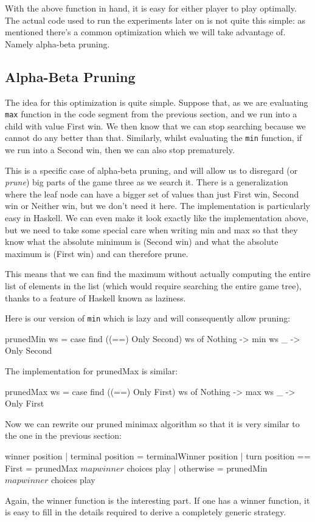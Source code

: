 With the above function in hand, it is easy for either player to play optimally.
The actual code used to run the experiments later on is not quite this simple: as mentioned there's a common optimization which we will take advantage of.
Namely alpha-beta pruning.

\subsection {Alpha-Beta Pruning}

The idea for this optimization is quite simple.
Suppose that, as we are evaluating \texttt{max} function in the code segment from the previous section, and we run into a child with value First win.
We then know that we can stop searching because we cannot do any better than that.
Similarly, whilst evaluating the \texttt{min} function, if we run into a Second win, then we can also stop prematurely.

This is a specific case of alpha-beta pruning, and will allow us to disregard (or \emph{prune}) big parts of the game three as we search it.
There is a generalization where the leaf node can have a bigger set of values than just First win, Second win or Neither win, but we don't need it here.
The implementation is particularly easy in Haskell. We can even make it look exactly like the implementation above, but we need to take some special care when writing min and max so that they know what the absolute minimum is (Second win) and what the absolute maximum is (First win) and can therefore prune.

This means that we can find the maximum without actually computing the entire list of elements in the list (which would require searching the entire game tree), thanks to a feature of Haskell known as laziness.

Here is our version of \texttt{min} which is lazy and will consequently allow pruning:
\begin{code}
  prunedMin ws = 
    case find ((==) Only Second) ws of
      Nothing -> min ws
      _ -> Only Second
\end{code}
The implementation for prunedMax is similar:
\begin{code}
  prunedMax ws = 
    case find ((==) Only First) ws of
      Nothing -> max ws
      _ -> Only First
\end{code}
Now we can rewrite our pruned minimax algorithm so that it is very similar to the one in the previous section:
\begin{code}
  winner position
    | terminal position       = terminalWinner position
    | turn position == First  = prunedMax $ map winner $ choices play
    | otherwise               = prunedMin $ map winner $ choices play
\end{code}
Again, the winner function is the interesting part. If one has a winner function, it is easy to fill in the details required to derive a completely generic strategy.
